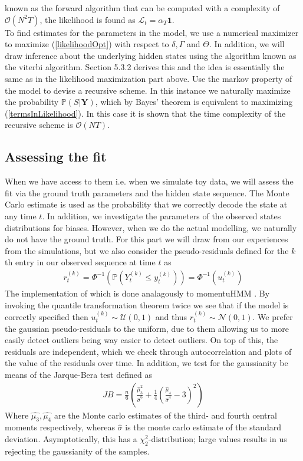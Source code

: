  known as the forward algorithm that can be computed with a complexity of $\mathcal{O}(N^2T)$, the likelihood is found as $\mathcal{L}_t = \alpha_T\mathbf{1}$.\\ To find estimates for the parameters in the model, we use a numerical maximizer to maximize (\ref{likelihoodOpt}) with respect to $\delta, \Gamma$ and $\Theta$. In addition, we will draw inference about the underlying hidden states using the algorithm known as the viterbi algorithm. Section 5.3.2 \cite{HHMForTimesSeries}  derives this and the idea is essentially the same as in the likelihood maximization part above. Use the markov property of the model to devise a recursive scheme. In this instance we naturally maximize the probability $\mathbb{P}(S | \mathbf{Y})$, which by Bayes' theorem is equivalent to maximizing (\ref{termsInLikelihood}). In this case it is shown that the time complexity of the recursive scheme is $\mathcal{O}(NT)$. \cite{HHMForTimesSeries}
\subsection{Assessing the fit}
When we have access to them i.e. when we simulate toy data, we will assess the fit via the ground truth parameters and the hidden state sequence. The Monte Carlo estimate is used as the probability that we correctly decode the state at any time $t$. In addition, we investigate the parameters of the observed states distributions for biases. However, when we do the actual modelling, we naturally do not have the ground truth. For this part we will draw from our experiences from the simulations, but we also consider the pseudo-residuals defined for the $k$th entry in our observed sequence at time $t$ as \cite{HHMForTimesSeries}
\begin{align}
    r_t^{(k)} = \Phi^{-1}\left(\mathbb{P}\left(Y_t^{(k)} \leq y_t^{(k)}\right)\right) = \Phi^{-1}\left(u_t^{(k)}\right) \label{pseudoresidualsFormula}
\end{align}
The implementation of which is done analagously to momentuHMM \cite{momentuHMM}.
By invoking the quantile transformation theorem twice we see that if the model is correctly specified then $u_t^{(k)}\sim \mathcal{U}(0,1)$ and thus $r_t^{(k)}\sim\mathcal{N}\left(0,1\right)$. We prefer the gaussian pseudo-residuals to the uniform, due to them allowing us to more easily detect outliers being way easier to detect outliers. On top of this, the residuals are independent, which we check through autocorrelation and plots of the value of the residuals over time. In addition, we test for the gaussianity be means of the Jarque-Bera test defined as
\begin{align}
    JB = \frac{n}{6}\left(\frac{\hat{\mu}_3^2}{\hat{\sigma}^6}+\frac{1}{4}\left(\frac{\hat{\mu}_4}{\hat{\sigma}^4}-3\right)^2\right)
\end{align}
Where $\hat{\mu_3}, \hat{\mu_4}$ are the Monte carlo estimates of the third- and fourth central moments respectively, whereas $\hat{\sigma}$ is the monte carlo estimate of the standard deviation. Asymptotically, this has a $\chi_2^2$-distribution; large values results in us rejecting the gaussianity of the samples.\cite{tseries}
